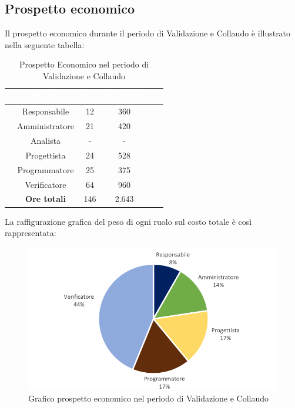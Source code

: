 \subsection{Prospetto economico}
Il prospetto economico durante il periodo di Validazione e Collaudo è illustrato nella seguente tabella:

\begin{table}[ht]
	\begin{center}
		\begin{tabular}{cccccc}
			\rowcolor{coolblack}
			\hline
			&\textcolor{white}{Ruolo}&	\textcolor{white}{Ore} &\textcolor{white}{Costo(\euro)} \\
			\hline
			&Responsabile           &12&360\\
			&Amministratore        & 21& 420 \\
			&Analista                   & -& -\\
			&Progettista              &  24& 528\\
			&Programmatore       & 25& 375 \\
			&Verificatore             & 64& 960\\
			\hline
			&\textbf{Ore totali}    &146&2.643\\
		\end{tabular}
		\caption{Prospetto Economico nel periodo di Validazione e Collaudo}
	\end{center}
\end{table}

La raffigurazione grafica del peso di ogni ruolo sul costo totale è così rappresentata:
\begin{figure}[!ht]
	\begin{center}
		\includegraphics{images/grafoValidazioneCollaudoEuro.png}
		\caption{Grafico prospetto economico nel periodo di Validazione e Collaudo}
	\end{center}
\end{figure}
\newpage
